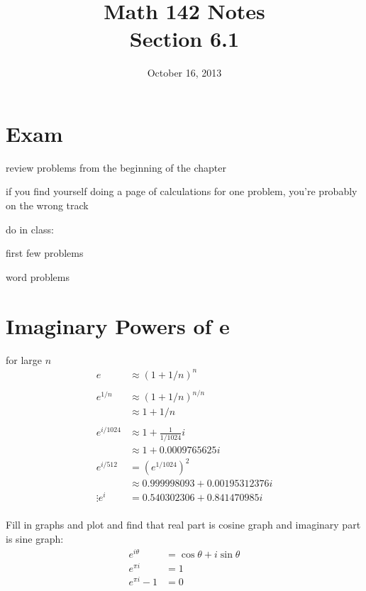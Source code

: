 \documentclass{exam}
\title{Math 142 Notes \\ Section 6.1}
\date{October 16, 2013}
\begin{document}
  \maketitle
  \tableofcontents

  \section{Exam}
  \begin{itemize*}
    \item review problems from the beginning of the chapter
    \item if you find yourself doing a page of calculations for one problem, you're probably on the wrong track
    \item do in class: 
      \begin{itemize*}
        \item first few problems
        \item word problems
      \end{itemize*}
  \end{itemize*}

  \section{Imaginary Powers of e}

  for large $n$
  \begin{align*}
    e       & \approx \left( 1 + 1/n \right)^n \\
    \\
    e^{1/n} & \approx \left( 1 + 1/n \right)^{n/n} \\
            & \approx 1 + 1/n \\
    \\
    e^{i/1024} & \approx 1 + \frac{1}{1/1024} i \\
               & \approx 1 + 0.0009765625 i \\
    e^{i/512}  & = \left( e^{1/1024} \right)^2 \\
               & \approx 0.999998093 + 0.00195312376 i \\
    \vdots
    e^{i} &= 0.540302306 + 0.841470985 i \\
  \end{align*}

  Fill in graphs and plot and find that real part is cosine graph and imaginary part is sine graph:
  \begin{align*}
    e^{i \theta} & = \cos \theta + i \sin \theta \\
    e^{\pi i}    & = 1 \\
    e^{\pi i} -1 & = 0 \\
  \end{align*}
\end{document}
